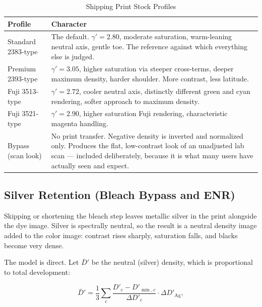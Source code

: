 \begin{table}[htbp]
\caption{Shipping Print Stock Profiles}
\label{tab:printstocks}
\begin{center}
\renewcommand{\arraystretch}{1.15}
\begin{tabularx}{\columnwidth}{@{}l>{\raggedright\arraybackslash}X@{}}
\toprule
\textbf{Profile} & \textbf{Character} \\
\midrule
Standard 2383-type & The default. $\gamma' = 2.80$, moderate saturation, warm-leaning neutral axis, gentle toe. The reference against which everything else is judged. \\
Premium 2393-type & $\gamma' = 3.05$, higher saturation via steeper cross-terms, deeper maximum density, harder shoulder. More contrast, less latitude. \\
Fuji 3513-type & $\gamma' = 2.72$, cooler neutral axis, distinctly different green and cyan rendering, softer approach to maximum density. \\
Fuji 3521-type & $\gamma' = 2.90$, higher saturation Fuji rendering, characteristic magenta handling. \\
Bypass (scan look) & No print transfer. Negative density is inverted and normalized only. Produces the flat, low-contrast look of an unadjusted lab scan --- included deliberately, because it is what many users have actually seen and expect. \\
\bottomrule
\end{tabularx}
\end{center}
\end{table}

\subsection{Silver Retention (Bleach Bypass and ENR)}

Skipping or shortening the bleach step leaves metallic silver in the print
alongside the dye image. Silver is spectrally neutral, so the result is a
neutral density image added to the color image: contrast rises sharply,
saturation falls, and blacks become very dense.

The model is direct. Let $\bar{D}'$ be the neutral (silver) density, which is
proportional to total development:

\begin{equation}
\bar{D}' = \frac{1}{3}\sum_c \frac{D'_c - D'_{\min,c}}{\Delta D'_c} \cdot \Delta D'_{\mathrm{Ag}},
\end{equation}

